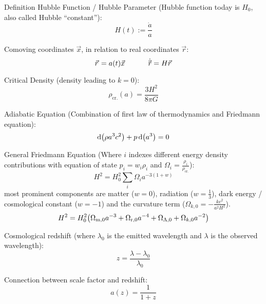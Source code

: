 			\noindent
			Definition Hubble Function / Hubble Parameter{} (Hubble function today is $H_0$, also called Hubble ``constant''):
			\begin{equation}
				H(t) := \frac{\dot{a}}{a}
			\end{equation}

			\noindent
			Comoving coordinates $\vec{x}$, in relation to real coordinates $\vec{r}$:
			\begin{equation}
				\vec{r} = a(t) \vec{x}
				\hsp
				\dot{\vec{r}} = H \vec{r}
			\end{equation}

			\noindent
			Critical Density (\ie density leading to $k=0$):
			\begin{equation}
				\rho_\text{cr.} (a) = \frac{3 H^2}{8 \pi G}
			\end{equation}

			\noindent
			Adiabatic Equation (Combination of first law of thermodynamics and Friedmann equation):
			\begin{equation}
				\dd \qty(\rho a^3 c^2) + p \dd (a^3) = 0
			\end{equation}

			\noindent
			General Friedmann Equation (Where $i$ indexes different energy density contributions with equation of state $p_i = w_i \rho_i$ and $\Omega_i = \frac{\rho_i}{\rho_\text{cr.}}$):
			\begin{equation}
				H^2 = H_0^2\sum_i \Omega_i a^{-3(1+w)}
			\end{equation}
			most prominent components are matter ($w=0$), radiation ($w=\frac{1}{3}$), dark energy / cosmological constant ($w=-1$) and the curvature term ($\Omega_{k,0}=-\frac{k c^2}{a^2 H^2}$).
			\begin{equation}
				H^2 = H_0^2 \qty(\Omega_{\text{m},0} a^{-3} + \Omega_{\text{r},0} a^{-4} + \Omega_{\Lambda,0} + \Omega_{k,0} a^{-2})
			\end{equation}

			Cosmological redshift (where $\lambda_0$ is the emitted wavelength and $\lambda$ is the observed wavelength):
			\begin{equation}
				z = \frac{\lambda - \lambda_0}{\lambda_0}
			\end{equation}

			\noindent
			Connection between scale factor and redshift:
			\begin{equation}
				a(z) = \frac{1}{1+z}
			\end{equation}

